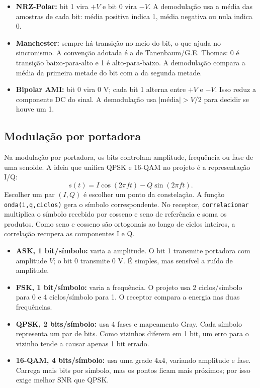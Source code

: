 \documentclass[10pt,a4paper]{article}
\newcommand{\codigo}[1]{\texttt{#1}}
\begin{document}
\begin{itemize}
\item \textbf{NRZ-Polar:} bit 1 vira \(+V\) e bit 0 vira \(-V\). A demodulação usa a média das amostras de cada bit: média positiva indica 1, média negativa ou nula indica 0.
\item \textbf{Manchester:} sempre há transição no meio do bit, o que ajuda no sincronismo. A convenção adotada é a de Tanenbaum/G.E. Thomas: 0 é transição baixo-para-alto e 1 é alto-para-baixo. A demodulação compara a média da primeira metade do bit com a da segunda metade.
\item \textbf{Bipolar AMI:} bit 0 vira 0 V; cada bit 1 alterna entre \(+V\) e \(-V\). Isso reduz a componente DC do sinal. A demodulação usa \(|\text{média}| > V/2\) para decidir se houve um 1.
\end{itemize}

\subsection{Modulação por portadora}

Na modulação por portadora, os bits controlam amplitude, frequência ou fase de uma senoide. A ideia que unifica QPSK e 16-QAM no projeto é a representação I/Q:
\[
s(t)=I\cos(2\pi ft)-Q\sin(2\pi ft).
\]
Escolher um par \((I,Q)\) é escolher um ponto da constelação. A função \codigo{onda(i,q,ciclos)} gera o símbolo correspondente. No receptor, \codigo{correlacionar} multiplica o símbolo recebido por cosseno e seno de referência e soma os produtos. Como seno e cosseno são ortogonais ao longo de ciclos inteiros, a correlação recupera as componentes I e Q.

\begin{itemize}
\item \textbf{ASK, 1 bit/símbolo:} varia a amplitude. O bit 1 transmite portadora com amplitude \(V\); o bit 0 transmite 0 V. É simples, mas sensível a ruído de amplitude.
\item \textbf{FSK, 1 bit/símbolo:} varia a frequência. O projeto usa 2 ciclos/símbolo para 0 e 4 ciclos/símbolo para 1. O receptor compara a energia nas duas frequências.
\item \textbf{QPSK, 2 bits/símbolo:} usa 4 fases e mapeamento Gray. Cada símbolo representa um par de bits. Como vizinhos diferem em 1 bit, um erro para o vizinho tende a causar apenas 1 bit errado.
\item \textbf{16-QAM, 4 bits/símbolo:} usa uma grade 4x4, variando amplitude e fase. Carrega mais bits por símbolo, mas os pontos ficam mais próximos; por isso exige melhor SNR que QPSK.
\end{itemize}
\end{document}
